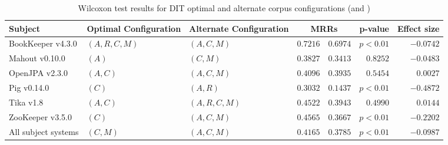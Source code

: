 \begin{landscape}
\begin{table}
\begin{spacing}{1.2}
\centering
\caption{Wilcoxon test results for DIT optimal and alternate corpus configurations (\cone and \ctwo)}
\label{table:combo-dit-corpus-sweep-wilcox}
\begin{tabular}{lllrrrr}
\toprule
                      Subject & Optimal Configuration & Alternate Configuration & \multicolumn{2}{c}{MRRs}  &  p-value & Effect size \\
\midrule
            BookKeeper v4.3.0 &        $(A, R, C, M)$ &             $(A, C, M)$ &    $0.7216$ &      $0.6974$ & $p<0.01$ &   $-0.0742$ \\
               Mahout v0.10.0 &                 $(A)$ &                $(C, M)$ &    $0.3827$ &      $0.3413$ & $0.8252$ &   $-0.0483$ \\
               OpenJPA v2.3.0 &              $(A, C)$ &             $(A, C, M)$ &    $0.4096$ &      $0.3935$ & $0.5454$ &    $0.0027$ \\
                  Pig v0.14.0 &                 $(C)$ &                $(A, R)$ &    $0.3032$ &      $0.1437$ & $p<0.01$ &   $-0.4872$ \\
                    Tika v1.8 &              $(A, C)$ &          $(A, R, C, M)$ &    $0.4522$ &      $0.3943$ & $0.4990$ &    $0.0144$ \\
             ZooKeeper v3.5.0 &                 $(C)$ &             $(A, C, M)$ &    $0.4565$ &      $0.3667$ & $p<0.01$ &   $-0.2202$ \\
 \midrule
All subject systems &              $(C, M)$ &             $(A, C, M)$ &    $0.4165$ &      $0.3785$ & $p<0.01$ &   $-0.0987$ \\
\bottomrule
\end{tabular}

\end{spacing}
\end{table}

\end{landscape}
